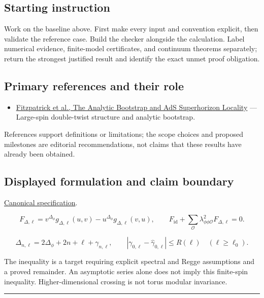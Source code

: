 \documentclass[
  11pt,
]{article}
\providecommand{\tightlist}{%
  \setlength{\itemsep}{0pt}\setlength{\parskip}{0pt}}
\begin{document}
\subsection{Starting instruction}

Work on the baseline above. First make every input and convention
explicit, then validate the reference case. Build the checker alongside
the calculation. Label numerical evidence, finite-model certificates,
and continuum theorems separately; return the strongest justified result
and identify the exact unmet proof obligation.

\subsection{Primary references and their role}

\begin{itemize}
\tightlist
\item
  \href{https://arxiv.org/abs/1212.3616}{Fitzpatrick et al., The
  Analytic Bootstrap and AdS Superhorizon Locality} --- Large-spin
  double-twist structure and analytic bootstrap.
\end{itemize}

References support definitions or limitations; the scope choices and
proposed milestones are editorial recommendations, not claims that these
results have already been obtained.

\subsection{Displayed formulation and claim boundary}

\href{https://github.com/rick-stevens-ai/Pure-Thought/blob/main/PRDs/04-Modular-Lightcone-Bootstrap.md}{Canonical
specification}.

\[F_{\Delta,\ell}=v^{\Delta_\phi}g_{\Delta,\ell}(u,v)
-u^{\Delta_\phi}g_{\Delta,\ell}(v,u),\qquad
F_{\mathrm{id}}+\sum_{\mathcal O}\lambda_{\phi\phi\mathcal O}^{2}F_{\Delta,\ell}=0.\]

\[\Delta_{n,\ell}=2\Delta_\phi+2n+\ell+\gamma_{n,\ell},\qquad
|\gamma_{0,\ell}-\widehat\gamma_{0,\ell}|\le R(\ell)\quad(\ell\ge\ell_0).\]

The inequality is a target requiring explicit spectral and Regge
assumptions and a proved remainder. An asymptotic series alone does not
imply this finite-spin inequality. Higher-dimensional crossing is not
torus modular invariance.

\begin{center}\rule{0.5\linewidth}{0.5pt}\end{center}
\end{document}

